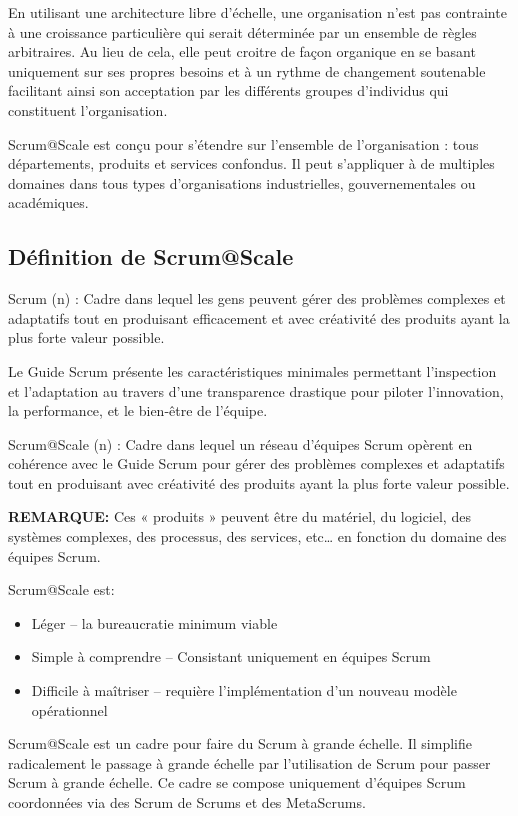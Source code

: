 \documentclass[12pt,a4paper,parskip=full]{scrartcl}
\begin{document}
En utilisant une architecture libre d’échelle, une organisation n’est pas contrainte à une
croissance particulière qui serait déterminée par un ensemble de règles arbitraires. Au lieu
de cela, elle peut croitre de façon organique en se basant uniquement sur ses propres
besoins et à un rythme de changement soutenable facilitant ainsi son acceptation par les
différents groupes d’individus qui constituent l’organisation.

Scrum@Scale est conçu pour s’étendre sur l’ensemble de l’organisation : tous
départements, produits et services confondus. Il peut s’appliquer à de multiples domaines
dans tous types d’organisations industrielles, gouvernementales ou académiques.

\subsection{Définition de Scrum@Scale}
Scrum (n) : Cadre dans lequel les gens peuvent gérer des problèmes complexes et
adaptatifs tout en produisant efficacement et avec créativité des produits ayant la plus
forte valeur possible.

Le Guide Scrum présente les caractéristiques minimales permettant l’inspection et
l’adaptation au travers d’une transparence drastique pour piloter l’innovation, la
performance, et le bien-être de l’équipe.

Scrum@Scale (n) : Cadre dans lequel un réseau d’équipes Scrum opèrent en cohérence
avec le Guide Scrum pour gérer des problèmes complexes et adaptatifs tout en produisant
avec créativité des produits ayant la plus forte valeur possible.

\textbf{REMARQUE:} Ces « produits » peuvent être du matériel, du logiciel, des systèmes
complexes, des processus, des services, etc… en fonction du domaine des équipes
Scrum.

Scrum@Scale est:
\begin{itemize}
\item Léger – la bureaucratie minimum viable
\item Simple à comprendre – Consistant uniquement en équipes Scrum
\item Difficile à maîtriser – requière l’implémentation d’un nouveau modèle opérationnel
\end{itemize}


Scrum@Scale est un cadre pour faire du Scrum à grande échelle. Il simplifie radicalement
le passage à grande échelle par l’utilisation de Scrum pour passer Scrum à grande
échelle. Ce cadre se compose uniquement d’équipes Scrum coordonnées via des Scrum
de Scrums et des MetaScrums.
\end{document}
